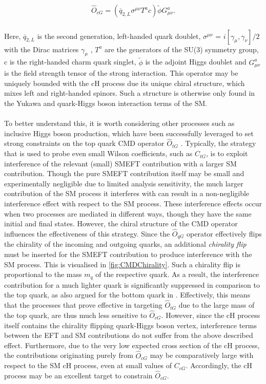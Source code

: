 \begin{align}
    \hat{O}_{cG} = (\overline{q}_{2, L} \sigma^{\mu\nu} T^ac)\tilde{\phi}G_{\mu\nu}^a. 
\end{align}
\\
Here, $\overline{q}_{2, L}$ is the second generation, left-handed quark doublet, $\sigma^{\mu\nu}$ = $i[\gamma_{\mu}, \gamma_{\nu}]/2$ with the Dirac matrices $\gamma_{\mu}$ , $T^a$ are the generators of the SU(3) symmetry group, c is the right-handed charm quark singlet, $\tilde{\phi}$ is the adjoint Higgs doublet and $G_{\mu\nu}^a$ is the field strength tensor of the strong interaction. This operator may be uniquely bounded with the cH process due its unique chiral structure, which mixes left and right-handed spinors. Such a structure is otherwise only found in the Yukawa and quark-Higgs boson interaction terms of the SM. \\
\\
To better understand this, it is worth considering other processes such as inclusive Higgs boson production, which have been successfully leveraged to set strong constraints on the top quark CMD operator $\hat{O}_{tG}$ \cite{CMSGlobalSMEFTFit}. Typically, the strategy that is used to probe even small Wilson coefficients, such as $C_{tG}$, is to exploit interference of the relevant (small) SMEFT contribution with a larger SM contribution. Though the pure SMEFT contribution itself may be small and experimentally negligible due to limited analysis sensitivity, the much larger contribution of the SM process it interferes with can result in a non-negligible interference effect with respect to the SM process. These interference effects occur when two processes are mediated in different ways, though they have the same initial and final states. However, the chiral structure of the CMD operator influences the effectiveness of this strategy. Since the $\hat{O}_{qG}$ operator effectively flips the chirality of the incoming and outgoing quarks, an additional \textit{chirality flip} must be inserted for the SMEFT contribution to produce interference with the SM process. This is visualised in \autoref{fig:CMDChirality}. Such a chirality flip is proportional to the mass $m_q$ of the respective quark. As a result, the interference contribution for a much lighter quark is significantly suppressed in comparison to the top quark, as also argued for the bottom quark in \cite{PhysRevD.93.053001}. Effectively, this means that the processes that prove effective in targeting $\hat{O}_{tG}$ due to the large mass of the top quark, are thus much less sensitive to $\hat{O}_{cG}$. However, since the cH process itself contains the chirality flipping quark-Higgs boson vertex, interference terms between the EFT and SM contributions do not suffer from the above described effect. Furthermore, due to the very low expected cross section of the cH process, the contributions originating purely from $\hat{O}_{cG}$ may be comparatively large with respect to the SM cH process, even at small values of $C_{cG}$. Accordingly, the cH process may be an excellent target to constrain $\hat{O}_{cG}$. 
